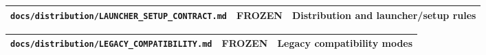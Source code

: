 \documentclass[9pt,a4paper,openany]{book}
\newcommand{\toprule}{\hline}
\newcommand{\midrule}{\hline}
\newcommand{\bottomrule}{\hline}
\begin{document}
\begin{center}
{\small\renewcommand{\arraystretch}{1.18}
\begin{tabularx}{\linewidth}{@{}>{\raggedright\arraybackslash}X >{\raggedright\arraybackslash}X >{\raggedright\arraybackslash}X@{}}
\toprule
\textbf{\texttt{docs/\allowbreak{}distribution/\allowbreak{}LAUNCHER\_\allowbreak{}SETUP\_\allowbreak{}CONTRACT.\allowbreak{}md}} & \textbf{FROZEN} & \textbf{Distribution and launcher/\allowbreak{}setup rules} \\
\midrule
\bottomrule
\end{tabularx}
}
\end{center}


\begin{center}
{\small\renewcommand{\arraystretch}{1.18}
\begin{tabularx}{\linewidth}{@{}>{\raggedright\arraybackslash}X >{\raggedright\arraybackslash}X >{\raggedright\arraybackslash}X@{}}
\toprule
\textbf{\texttt{docs/\allowbreak{}distribution/\allowbreak{}LEGACY\_\allowbreak{}COMPATIBILITY.\allowbreak{}md}} & \textbf{FROZEN} & \textbf{Legacy compatibility modes} \\
\midrule
\bottomrule
\end{tabularx}
}
\end{center}
\end{document}
